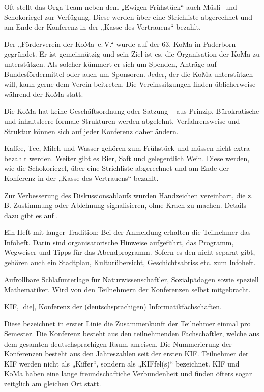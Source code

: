 \documentclass{neulingsheft}
\begin{document}
{\begin{description}
	Oft stellt das Orga-Team neben dem „Ewigen Frühstück“ auch Müsli- und
	Schokoriegel zur Verfügung. Diese werden über eine Strichliste abgerechnet
	und am Ende der Konferenz in der „Kasse des Vertrauens“ bezahlt.

\item[Förderverein der KoMa e.\,V.] Der „Förderverein der KoMa~e.\,V.“ wurde
	auf der 63. KoMa in Paderborn gegründet. Er ist gemeinnützig und sein Ziel
	ist es, die Organisation der KoMa zu unterstützen. Als solcher kümmert er
	sich um Spenden, Anträge auf Bundesfördermittel oder auch um Sponsoren.
	Jeder, der die KoMa unterstützen will, kann gerne dem Verein beitreten. Die
	Vereinssitzungen finden üblicherweise während der KoMa statt.

\item[Geschäftsordnung] Die KoMa hat keine Geschäftsordnung oder Satzung – aus
	Prinzip. Bürokratische und inhaltsleere formale Strukturen werden
	abgelehnt. Verfahrensweise und Struktur können sich auf jeder Konferenz
	daher ändern.

\item[Getränke] Kaffee, Tee, Milch und Wasser gehören zum Frühstück und müssen
	nicht extra bezahlt werden. Weiter gibt es Bier, Saft und gelegentlich
	Wein. Diese werden, wie die Schokoriegel, über eine Strichliste abgerechnet
	und am Ende der Konferenz in der „Kasse des Vertrauens“ bezahlt.

\item[Handzeichen] Zur Verbesserung des Diskussionsablaufs wurden Handzeichen
	vereinbart, die z.\,B. Zustimmung oder Ablehnung signalisieren, ohne Krach
	zu machen. Details dazu gibt es auf .

\item[Infoheft] Ein Heft mit langer Tradition: Bei der Anmeldung erhalten die
	Teilnehmer das Infoheft. Darin sind organisatorische Hinweise aufgeführt,
	das Programm, Wegweiser und Tipps für das Abendprogramm. Sofern es den
	nicht separat gibt, gehören auch ein Stadtplan, Kulturübersicht,
	Geschichtsabriss etc. zum Infoheft.

\item[Isomathe] Aufrollbare Schlafunterlage für Naturwissenschaftler,
	Sozialpädagen sowie speziell Mathematiker. Wird von den Teilnehmern der
	Konferenzen selbst mitgebracht.

\item[KIF] KIF, [die], Konferenz der (deutschsprachigen)
	Informatikfachschaften.

	Diese bezeichnet in erster Linie die Zusammenkunft der Teilnehmer einmal
	pro Semester. Die Konferenz besteht aus den teilnehmenden Fachschaftler,
	welche aus dem gesamten deutschsprachigen Raum anreisen. Die Nummerierung
	der Konferenzen besteht aus den Jahreszahlen seit der ersten KIF.\@
	Teilnehmer der KIF werden nicht als „Kiffer“, sondern als „KIFfel(s)“
	bezeichnet. KIF und KoMa haben eine lange freundschaftiche Verbundenheit
	und finden öfters sogar zeitglich am gleichen Ort statt.


\end{description}}
\end{document}
